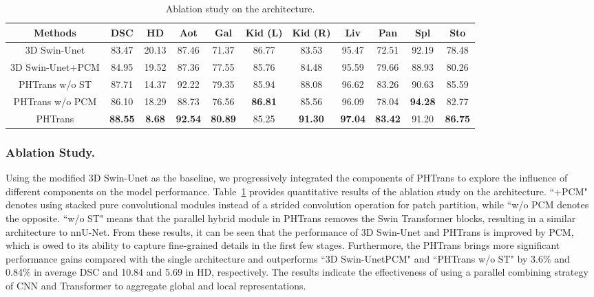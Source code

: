 \documentclass[runningheads]{llncs}
\begin{document}
\begin{table}[tbp]
\centering
\caption{Ablation study on the architecture. 
}\label{tab4}
\renewcommand\arraystretch{1.2}
\scriptsize
\begin{tabular}{c|cc|cccccccc}

\hline
Methods    & DSC   & HD    & Aot & Gal    & Kid (L) & Kid (R) & Liv & Pan & Spl & Sto \\
\hline
3D Swin-Unet      & 83.47 & 20.13 & 87.46 & 71.37       & 86.77      & 83.53      & 95.47 & 72.51    & 92.19  & 78.48   \\
3D Swin-Unet+PCM & 84.95 & 19.52 & 87.36 & 77.55       & 85.76      & 84.48      & 95.59 & 79.66    & 88.93  & 80.26   \\
PHTrans w/o ST   & 87.71 & 14.37 & 92.22 & 79.35       & 85.94      & 88.08      & 96.62 & 83.26    & 90.63  & 85.59   \\
PHTrans w/o PCM  & 86.10          & 18.29         & 88.73          & 76.56          & \textbf{86.81} & 85.56          & 96.09          & 78.04          & \textbf{94.28} & 82.77          \\
PHTrans          & \textbf{88.55} & \textbf{8.68} & \textbf{92.54} & \textbf{80.89} & 85.25          & \textbf{91.30} & \textbf{97.04} & \textbf{83.42} & 91.20          & \textbf{86.75}  \\ \hline
\end{tabular}
\end{table}

\subsubsection{Ablation Study.}

Using the modified 3D Swin-Unet as the baseline, we progressively integrated the components of PHTrans to explore the influence of different components on the model performance. Table~\ref{tab4} provides quantitative results of the ablation study on the architecture. ``+PCM" denotes using stacked pure convolutional modules instead of a strided convolution operation for patch partition, while ``w/o PCM denotes the opposite. ``w/o ST" means that the parallel hybrid module in PHTrans removes the Swin Transformer blocks, resulting in a similar architecture to nnU-Net. From these results, it can be seen that the performance of 3D Swin-Unet and PHTrans is improved by PCM, which is owed to its ability to capture fine-grained details in the first few stages. Furthermore, the PHTrans brings more significant performance gains compared with the single architecture and outperforms ``3D Swin-UnetPCM" and ``PHTrans w/o ST" by 3.6\% and 0.84\% in average DSC and 10.84 and 5.69 in HD, respectively. The results indicate the effectiveness of using a parallel combining strategy of CNN and Transformer to aggregate global and local representations.
\end{document}
